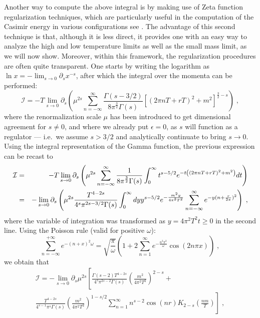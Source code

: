 Another way to compute the above integral is by making use of Zeta function regularization
techniques, which are particularly useful in the computation  of the Casimir energy in various
configurations see \cite{elizalde95,bordag10}. The advantage of this second technique is that,
although it is less direct, it provides one with an easy way to analyze the high and low
temperature limits as well as the small mass limit, as we will now show. Moreover, within this
framework, the regularization procedures are often quite transparent. One starts by writing the
logarithm as $\ln x=-\lim_{s\rightarrow 0}\partial _{s}x^{-s}$, after which the integral over
the momenta can be performed:
\begin{equation}
\mathcal{I}=-T\lim_{s\rightarrow 0}\partial _{s}\left( \mu
^{2s}\sum_{n=-\infty }^{\infty }\frac{\Gamma (s-3/2)}{8\pi ^{\frac{3}{2}%
}\Gamma (s)}\left[ (2\pi nT+rT)^{2}+m^{2}\right] ^{\frac{3}{2}-s}\right) \;,
\end{equation}%
where the renormalization scale $\mu $ has been introduced to get
dimensional agreement for $s\not=0$, and where we already put $\epsilon =0$, as $s$ will function as a regulator --- i.e.~we assume $s>3/2$ and
analytically continuate to bring $s\rightarrow 0$. Using the integral
representation of the Gamma function, the previous expression can be recast
to
\begin{eqnarray}
\mathcal{I} &=&-T\lim_{s\rightarrow 0}\partial _{s}\left( \mu
^{2s}\sum_{n=-\infty }^{\infty }\frac{1}{8\pi ^{\frac{3}{2}}\Gamma (s)}%
\int_{0}^{\infty }t^{s-5/2}e^{-t\left( (2\pi nT+rT)^{2}+m^{2}\right)
}dt\right)   \notag \\
&=&-\lim_{s\rightarrow 0}\partial _{s}\left( \mu ^{2s}\frac{T^{4-2s}}{%
4^{s}\pi ^{2s-3/2}\Gamma (s)}\int_{0}^{\infty }dyy^{s-5/2}e^{-\frac{m^{2}y%
}{4\pi ^{2}T^{2}}}\sum_{n=-\infty }^{\infty }e^{-y(n+\frac{r}{2\pi }%
)^{2}}\right) \;,
\end{eqnarray}%
where the variable of integration was transformed as $y=4\pi ^{2}T^{2}t\geq0 $ in
the second line. Using the Poisson rule (valid for positive $\omega $):
\begin{equation}
\sum_{n=-\infty }^{+\infty }e^{-(n+x)^{2}\omega }=\sqrt{\frac{\pi }{\omega }}%
\left( 1+2\sum_{n=1}^{\infty }e^{-\frac{n^{2}\pi ^{2}}{\omega }}\cos {(2n\pi
x)}\right) \;,
\end{equation}%
we obtain that
\begin{multline}
\mathcal{I}=-\lim_{s\rightarrow 0}\partial _{s}\mu ^{2s}\left[ \frac{\Gamma
(s-2)T^{4-2s}}{4^{s}\pi ^{2s-2}\Gamma (s)}\left( \frac{m^{2}}{4\pi ^{2}T^{2}}%
\right) ^{2-s}+\right.  \\
\left. \frac{T^{4-2s}}{4^{s-1}\pi ^{s}\Gamma (s)}\left( \frac{m^{2}}{4\pi
^{2}T^{2}}\right) ^{1-s/2}\sum_{n=1}^{\infty }{n^{s-2}\cos {(nr)}%
K_{2-s}\left( \frac{nm}{T}\right) }\right] \;,
\end{multline}%
